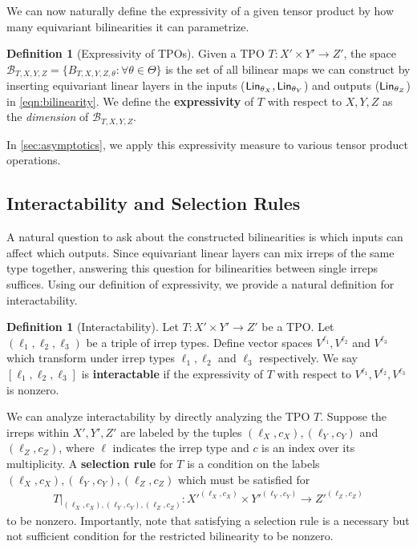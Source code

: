 \documentclass{article}
\theoremstyle{definition}
\newtheorem{definition}[theorem]{Definition}
\theoremstyle{remark}
\begin{document}
 We can now naturally define the expressivity of a given tensor product by how many equivariant bilinearities it can parametrize.
\begin{definition}[Expressivity of TPOs]
\label{def:expressivity}
    Given a TPO $T:X'\times Y'\to Z'$, the space $\mathcal{B}_{T,X,Y,Z}=\{B_{T,X,Y,Z,\theta}:\forall \theta\in\Theta\}$ is the set of all bilinear maps we can construct by inserting equivariant linear layers in the inputs ($\mathsf{Lin}_{\theta_X}, \mathsf{Lin}_{\theta_Y}$) and outputs ($\mathsf{Lin}_{\theta_Z}$) in \autoref{eqn:bilinearity}. We define the \textbf{expressivity} of $T$ with respect to $X,Y,Z$ as the \emph{dimension} of $\mathcal{B}_{T,X,Y,Z}$.
\end{definition}

In \autoref{sec:asymptotics}, we apply this expressivity measure to various tensor product operations.

\subsection{Interactability and Selection Rules}
\label{sec:interactability}

A natural question to ask about the constructed bilinearities is which inputs can affect which outputs. Since equivariant linear layers can mix irreps of the same type together, answering this question for bilinearities between single irreps suffices. Using our definition of expressivity, we provide a natural definition for interactability.

\begin{definition}[Interactability]
\label{def:interactibility}
    Let $T:X'\times Y'\to Z'$ be a TPO. Let $(\ell_1,\ell_2,\ell_3)$ be a triple of irrep types. Define vector spaces $V^{\ell_1},V^{\ell_2}$ and $V^{\ell_3}$ which transform under irrep types $\ell_1,\ell_2$ and $\ell_3$ respectively. We say $[\ell_1,\ell_2,\ell_3]$ is \textbf{interactable} if the expressivity of $T$ with respect to $V^{\ell_1},V^{\ell_2},V^{\ell_3}$ is nonzero.
\end{definition}

We can analyze interactability by directly analyzing the TPO $T$. Suppose the irreps within $X',Y',Z'$ are labeled by the tuples $(\ell_X,c_X), (\ell_Y,c_Y)$ and $(\ell_Z,c_Z)$, where $\ell$ indicates the irrep type and $c$ is an index over its multiplicity. A \textbf{selection rule} for $T$ is a condition on the labels $(\ell_X,c_X), (\ell_Y,c_Y), (\ell_Z,c_Z)$ which must be satisfied for 
\begin{align*}
    T|_{(\ell_X,c_X), (\ell_Y,c_Y), (\ell_Z,c_Z)}:X'^{(\ell_X,c_X)}\times Y'^{(\ell_Y,c_Y)}\to Z'^{(\ell_Z,c_Z)}
\end{align*} to be nonzero. Importantly, note that satisfying a selection rule is a necessary but not sufficient condition for the restricted bilinearity to be nonzero.
\end{document}
